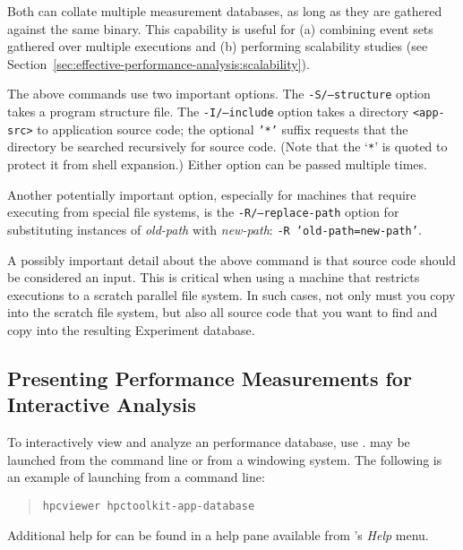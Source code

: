 \documentclass[11pt,letterpaper]{report}
\begin{document}
Both \hpcprofAll{} can collate multiple measurement databases, as long as they are gathered against the same binary.
This capability is useful for (a) combining event sets gathered over multiple executions and (b) performing scalability studies (see Section~\ref{sec:effective-performance-analysis:scalability}).

The above commands use two important options.
The \texttt{-S/--structure} option takes a program structure file.
The \texttt{-I/--include} option takes a directory \texttt{<app-src>} to application source code; the optional \texttt{'*'} suffix requests that the directory be searched recursively for source code.
(Note that the `\texttt{*}' is quoted to protect it from shell expansion.)
Either option can be passed multiple times.

Another potentially important option, especially for machines that require executing from special file systems, is the \texttt{-R/--replace-path} option for substituting instances of \emph{old-path} with \emph{new-path}: \texttt{-R 'old-path=new-path'}.

A possibly important detail about the above command is that source code should be considered an \hpcprofAll{} input.
This is critical when using a machine that restricts executions to a scratch parallel file system.
In such cases, not only must you copy \hpcprofmpi{} into the scratch file system, but also all source code that you want \hpcprofmpi{} to find and copy into the resulting Experiment database.



\subsection{Presenting Performance Measurements for Interactive Analysis}

To interactively view and analyze an \HPCToolkit{} performance database, use \hpcviewer{}.
\hpcviewer{} may be launched from the command line or from a windowing system.
The following is an example of launching from a command line:
\begin{quote}
  \verb|hpcviewer hpctoolkit-app-database|
\end{quote}
Additional help for \hpcviewer{} can be found in a help pane available from \hpcviewer{}'s \emph{Help} menu.

\end{document}
